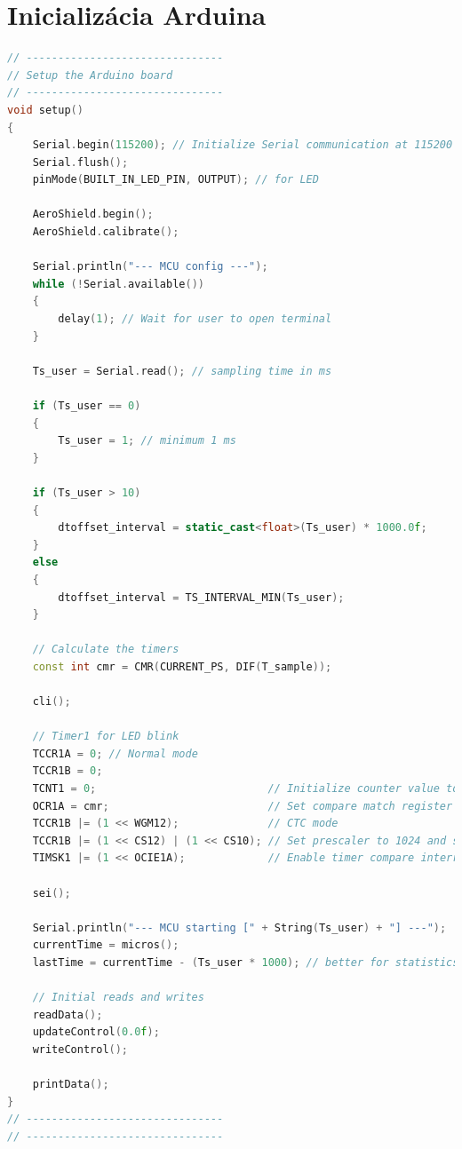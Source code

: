 \documentclass[a4paper, 10pt, ]{article}
\begin{document}
\section{Inicializácia Arduina}

\begin{lstlisting}[caption=Inicializačná metóda Arduina., label={code:setup}, language=C++]
// -------------------------------
// Setup the Arduino board
// -------------------------------
void setup()
{
    Serial.begin(115200); // Initialize Serial communication at 115200 baud rate
    Serial.flush();
    pinMode(BUILT_IN_LED_PIN, OUTPUT); // for LED

    AeroShield.begin();
    AeroShield.calibrate();

    Serial.println("--- MCU config ---");
    while (!Serial.available())
    {
        delay(1); // Wait for user to open terminal
    }

    Ts_user = Serial.read(); // sampling time in ms

    if (Ts_user == 0)
    {
        Ts_user = 1; // minimum 1 ms
    }

    if (Ts_user > 10)
    {
        dtoffset_interval = static_cast<float>(Ts_user) * 1000.0f;
    }
    else
    {
        dtoffset_interval = TS_INTERVAL_MIN(Ts_user);
    }

    // Calculate the timers
    const int cmr = CMR(CURRENT_PS, DIF(T_sample));

    cli();

    // Timer1 for LED blink
    TCCR1A = 0; // Normal mode
    TCCR1B = 0;
    TCNT1 = 0;                           // Initialize counter value to 0
    OCR1A = cmr;                         // Set compare match register for desired timer count
    TCCR1B |= (1 << WGM12);              // CTC mode
    TCCR1B |= (1 << CS12) | (1 << CS10); // Set prescaler to 1024 and start the timer
    TIMSK1 |= (1 << OCIE1A);             // Enable timer compare interrupt

    sei();

    Serial.println("--- MCU starting [" + String(Ts_user) + "] ---");
    currentTime = micros();
    lastTime = currentTime - (Ts_user * 1000); // better for statistics

    // Initial reads and writes
    readData();
    updateControl(0.0f);
    writeControl();

    printData();
}
// -------------------------------
// -------------------------------
\end{lstlisting}
\end{document}
